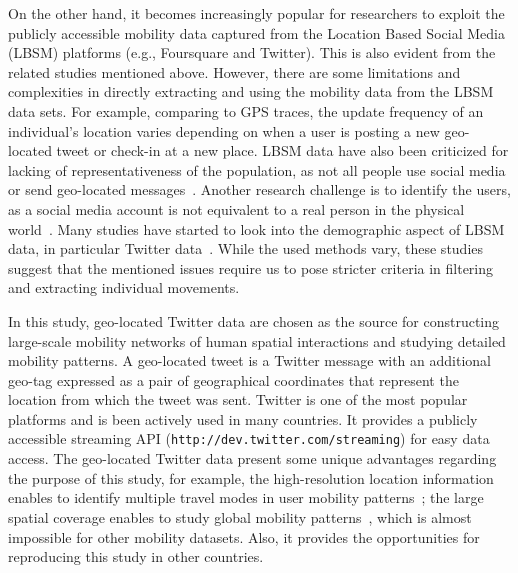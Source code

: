 \documentclass[]{tGIS2e}
\begin{document}
On the other hand, it becomes increasingly popular for researchers to exploit the publicly accessible mobility data captured from the Location Based Social Media (LBSM) platforms (e.g., Foursquare and Twitter).
This is also evident from the related studies mentioned above.
However, there are some limitations and complexities in directly extracting and using the mobility data from the LBSM data sets. 
For example, comparing to GPS traces, the update frequency of an individual's location varies depending on when a user is posting a new geo-located tweet or check-in at a new place.
LBSM data have also been criticized for lacking of representativeness of the population, as not all people use social media or send geo-located messages~\citep{kung2014}. 
Another research challenge is to identify the users, as a social media account is not equivalent to a real person in the physical world~\citep{tsou2015}.
Many studies have started to look into the demographic aspect of LBSM data, in particular Twitter data~\citep{steiger2015,luo2016}. 
While the used methods vary, these studies suggest that the mentioned issues require us to pose stricter criteria in filtering and extracting individual movements.

In this study, geo-located Twitter data are chosen as the source for constructing large-scale mobility networks of human spatial interactions and studying detailed mobility patterns.
A geo-located tweet is a Twitter message with an additional geo-tag expressed as a pair of geographical coordinates that represent the location from which the tweet was sent.
Twitter is one of the most popular platforms and is been actively used in many countries. 
It provides a publicly accessible streaming API ({\tt{http://dev.twitter.com/streaming}}) for easy data access.
The geo-located Twitter data present some unique advantages regarding the purpose of this study, for example, the high-resolution location information enables to identify multiple travel modes in user mobility patterns~\citep{jurdak2015}; the large spatial coverage enables to study global mobility patterns~\citep{hawelka}, which is almost impossible for other mobility datasets. Also, it provides the opportunities for reproducing this study in other countries.
\end{document}
